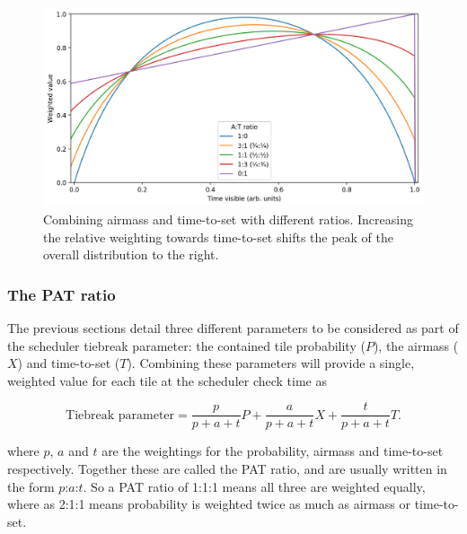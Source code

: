 \begin{colsection}
\begin{colsection}
\begin{figure}[p]
    \begin{center}
        \includegraphics[width=\linewidth]{images/at_ratio.png}
    \end{center}
    \caption[Combining airmass and time-to-set with different ratios]{
        Combining airmass and time-to-set with different ratios. Increasing the relative weighting towards time-to-set shifts the peak of the overall distribution to the right.
    }\label{fig:at_ratio}
\end{figure}

\clearpage

\subsubsection{The PAT ratio}

The previous sections detail three different parameters to be considered as part of the scheduler tiebreak parameter: the contained tile probability ($P$), the airmass ($X$) and time-to-set ($T$). Combining these parameters will provide a single, weighted value for each tile at the scheduler check time as

\begin{equation}
    \text{Tiebreak parameter} = \frac{p}{p+a+t} P + \frac{a}{p+a+t} X + \frac{t}{p+a+t} T.
    \label{eq:pat}
\end{equation}

where $p$, $a$ and $t$ are the weightings for the probability, airmass and time-to-set respectively. Together these are called the PAT ratio, and are usually written in the form $p$:$a$:$t$. So a PAT ratio of 1:1:1 means all three are weighted equally, where as 2:1:1 means probability is weighted twice as much as airmass or time-to-set.

\end{colsection}


\end{colsection}

